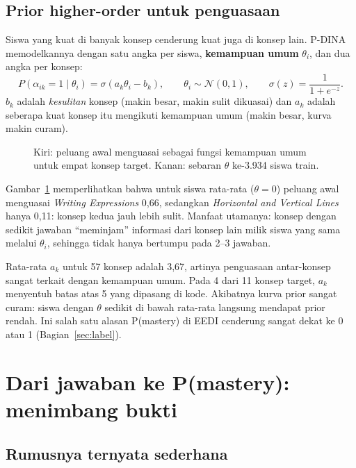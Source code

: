 \documentclass[11pt,a4paper]{article}
\begin{document}
\subsection{Prior higher-order untuk penguasaan}

Siswa yang kuat di banyak konsep cenderung kuat juga di konsep lain. P-DINA memodelkannya dengan satu angka per siswa,
\textbf{kemampuan umum} $\theta_i$, dan dua angka per konsep:
\[P(\alpha_{ik}=1\mid\theta_i)=\sigma(a_k\theta_i-b_k),\qquad \theta_i\sim\mathcal N(0,1),\qquad
\sigma(z)=\frac{1}{1+e^{-z}}.\]
$b_k$ adalah \emph{kesulitan} konsep (makin besar, makin sulit dikuasai) dan $a_k$ adalah seberapa kuat konsep itu
mengikuti kemampuan umum (makin besar, kurva makin curam).

\begin{figure}[h]
  \centering
  \setlength\figH{5.2cm}
  
  \caption{Kiri: peluang awal menguasai sebagai fungsi kemampuan umum untuk empat konsep target. Kanan: sebaran
  $\theta$ ke-3.934 siswa train.}
  \label{fig:ho}
\end{figure}

Gambar~\ref{fig:ho} memperlihatkan bahwa untuk siswa rata-rata ($\theta=0$) peluang awal menguasai \emph{Writing
Expressions} 0,66, sedangkan \emph{Horizontal and Vertical Lines} hanya 0,11: konsep kedua jauh lebih sulit. Manfaat
utamanya: konsep dengan sedikit jawaban ``meminjam'' informasi dari konsep lain milik siswa yang sama melalui
$\theta_i$, sehingga tidak hanya bertumpu pada 2--3 jawaban.

\begin{awas}
  Rata-rata $a_k$ untuk 57 konsep adalah 3,67, artinya penguasaan antar-konsep sangat terkait dengan kemampuan umum.
  Pada 4 dari 11 konsep target, $a_k$ menyentuh batas atas 5 yang dipasang di kode. Akibatnya kurva prior sangat
  curam: siswa dengan $\theta$ sedikit di bawah rata-rata langsung mendapat prior rendah. Ini salah satu alasan
  P(mastery) di EEDI cenderung sangat dekat ke 0 atau 1 (Bagian~\ref{sec:label}).
\end{awas}

\section{Dari jawaban ke P(mastery): menimbang bukti}
\label{sec:worked}

\subsection{Rumusnya ternyata sederhana}
\end{document}
